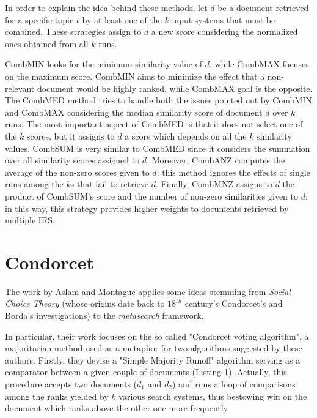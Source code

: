 \documentclass[letterpaper, 10 pt, conference]{ieeeconf}  %
\begin{document}
In order to explain the idea behind these methods, let $d$ be a document retrieved for a specific topic $t$ by at least one of the $k$ input systems that must be combined. These strategies assign to $d$ a new score considering the normalized ones obtained from all $k$ runs. 

CombMIN looks for the minimum similarity value of $d$, while CombMAX focuses on the maximum score. CombMIN aims to minimize the effect that a non-relevant document would be highly ranked, while CombMAX goal is the opposite. 
The CombMED method tries to handle both the issues pointed out by CombMIN and CombMAX considering the median similarity score of document $d$ over $k$ runs.
The most important aspect of CombMED is that it does not select one of the $k$ scores, but it assigns to $d$ a score which depends on all the $k$ similarity values.
CombSUM is very similar to CombMED since it considers the summation over all similarity scores assigned to $d$. Moreover, CombANZ computes the average of the non-zero scores given to $d$: this method ignores the effects of single runs among the $k$s that fail to retrieve $d$.
Finally, CombMNZ assigns to $d$ the product of CombSUM's score and the number of non-zero similarities given to $d$: in this way, this strategy provides higher weights to documents retrieved by multiple IRS. 

\section{Condorcet}

The work by Aslam and Montague \cite{c1} applies some ideas stemming from \textit{Social Choice Theory} (whose origins date back to $18^{th}$ century's Condorcet's and Borda's investigations) to the \textit{metasearch} framework.

In particular, their work focuses on the so called "Condorcet voting algorithm", a majoritarian method used as a metaphor for two algorithms suggested by these authors.
Firstly, they devise a "Simple Majority Runoff" algorithm serving as a comparator between a given couple of documents (Listing 1). Actually, this procedure accepts two documents ($d_1$ and $d_2$) and runs a loop of comparisons among the ranks yielded by $k$ various search systems, thus bestowing win on the document which ranks above the other one more frequently.

\lstset{
language=C++,
basicstyle=\small\ttfamily,
numbers=left,
numbersep=5pt,
xleftmargin=20pt,
frame=tb,
framexleftmargin=20pt
}
\end{document}

